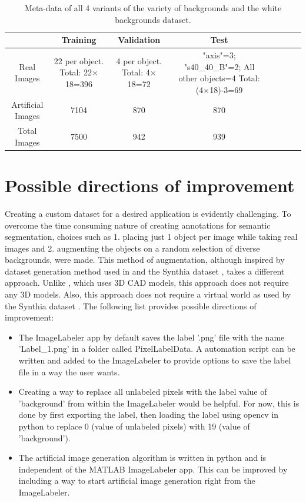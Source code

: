 \begin{table}
	\centering
	\begin{tabular}{|c|c|c|c|c|c|c|c|}
	\hline 
    & Training & Validation & Test \\ 
	\hline 
	Real Images & \makecell{22 per object.\\ Total: 22$\times$18=396} & \makecell{4 per object.\\ Total: 4$\times$18=72} & 				\makecell{"axis"=3; \\"s40\_40\_B"=2; \\All other objects=4\\ Total: (4$\times$18)-3=69} \\ 
	\hline 
	Artificial Images & 7104 & 870 & 870 \\ 
	\hline 
	Total Images & 7500 & 942 & 939 \\ 
	\hline 
	\end{tabular}
	\caption{Meta-data of all 4 variants of the variety of backgrounds and the white backgrounds dataset.} 
	\label{Table:meta}
\end{table}

\section{Possible directions of improvement}

Creating a custom dataset for a desired application is evidently challenging. To overcome the time consuming nature of creating annotations for semantic segmentation, choices such as 1. placing just 1 object per image while taking real images and 2. augmenting the objects on a random selection of diverse backgrounds, were made. This method of augmentation, although inspired by dataset generation method used in \cite{DBLP:journals/corr/abs-1709-00849} and the Synthia dataset \cite{RosCVPR16}, takes a different approach. Unlike \cite{DBLP:journals/corr/abs-1709-00849}, which uses 3D CAD models, this approach does not require any 3D models. Also, this approach does not require a virtual world as used by the Synthia dataset \cite{RosCVPR16}. 
The following list provides possible directions of improvement:
	\begin{itemize}
		\item The ImageLabeler app by default saves the label '.png' file with the name 'Label\_1.png' in a folder called PixelLabelData. A automation script can be written and added to the ImageLabeler to provide options to save the label file in a way the user wants.
		\item Creating a way to replace all unlabeled pixels with the label value of 'background' from within the ImageLabeler would be helpful. For now, this is done by first exporting the label, then loading the label using opencv in python to replace 0 (value of unlabeled pixels) with 19 (value of 'background').
		\item The artificial image generation algorithm is written in python and is independent of the MATLAB ImageLabeler app. This can be improved by including a way to start artificial image generation right from the ImageLabeler.
	\end{itemize}